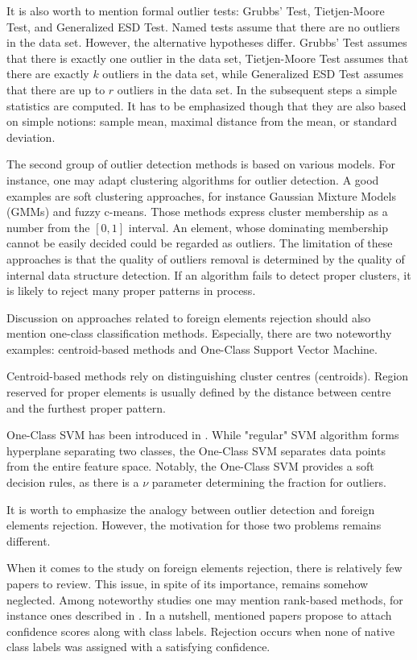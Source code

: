 \documentclass{llncs}
\begin{document}
It is also worth to mention formal outlier tests: Grubbs' Test, Tietjen-Moore Test, and Generalized ESD Test. Named tests assume that there are no outliers in the data set. However, the alternative hypotheses differ. Grubbs' Test assumes that there is exactly one outlier in the data set, Tietjen-Moore Test assumes that there are exactly $k$ outliers in the data set, while Generalized ESD Test assumes that there are up to $r$ outliers in the data set. In the subsequent steps a simple statistics are computed. It has to be emphasized though that they are also based on simple notions: sample mean, maximal distance from the mean, or standard deviation. 

The second group of outlier detection methods is based on various models. For instance, one may adapt clustering algorithms for outlier detection. A good examples are soft clustering approaches, for instance Gaussian Mixture Models (GMMs) and fuzzy c-means. Those methods express cluster membership as a number from the $[0,1]$ interval. An element, whose dominating membership cannot be easily decided could be regarded as outliers. The limitation of these approaches is that the quality of outliers removal is determined by the quality of internal data structure detection. If an algorithm fails to detect proper clusters, it is likely to reject many proper patterns in process.

Discussion on approaches related to foreign elements rejection should also mention one-class classification methods. Especially, there are two noteworthy examples: centroid-based methods and One-Class Support Vector Machine.

Centroid-based methods rely on distinguishing cluster centres (centroids). Region reserved for proper elements is usually defined by the distance between centre and the furthest proper pattern.

One-Class SVM has been introduced in \cite{ScholkopfWilliamsonSmola1992}. While "regular" SVM algorithm forms hyperplane separating two classes, the One-Class SVM separates data points from the entire feature space. Notably, the One-Class SVM provides a soft decision rules, as there is a $\nu$ parameter determining the fraction for outliers.  

It is worth to emphasize the analogy between outlier detection and foreign elements rejection. However, the motivation for those two problems remains different.

When it comes to the study on foreign elements rejection, there is relatively few papers to review. This issue, in spite of its importance, remains somehow neglected. Among noteworthy studies one may mention rank-based methods, for instance ones described in \cite{BertolamiZimmermannBunke2006,BurgerKessentiniPaquet2011,EladHel-OrKeshet2001,HempstalkFrankWitten2008,SchemeHudginsEnglehart2013,WangCasasent2009}.
In a nutshell, mentioned papers propose to attach confidence scores along with class labels. Rejection occurs when none of native class labels was assigned with a satisfying confidence.
\end{document}
